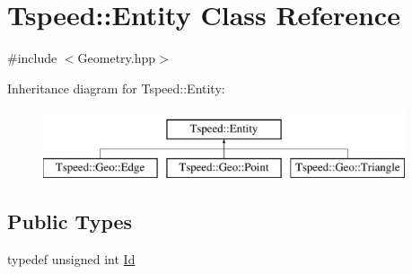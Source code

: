 \hypertarget{classTspeed_1_1Entity}{\section{Tspeed\-:\-:Entity Class Reference}
\label{classTspeed_1_1Entity}
}


{\ttfamily \#include $<$Geometry.\-hpp$>$}

Inheritance diagram for Tspeed\-:\-:Entity\-:\begin{figure}[H]
\begin{center}
\leavevmode
\includegraphics[height=2.000000cm]{classTspeed_1_1Entity}
\end{center}
\end{figure}
\subsection*{Public Types}
\begin{DoxyCompactItemize}
\item 
typedef unsigned int \hyperlink{classTspeed_1_1Entity_a32da920d1e9397a793b67beadd70e8fe}{Id}
\end{DoxyCompactItemize}
